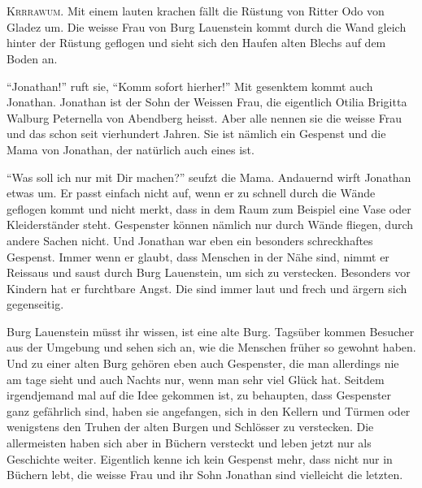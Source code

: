 \chapter*{}
\lettrine[lines=2]{\color{red}K}{rrrawum.} Mit einem lauten krachen fällt die Rüstung von Ritter Odo von Gladez um. Die weisse Frau von Burg Lauenstein kommt durch die Wand gleich hinter der Rüstung geflogen und sieht sich den Haufen alten Blechs auf dem Boden an.

\enquote{Jonathan!} ruft sie, \enquote{Komm sofort hierher!} Mit gesenktem kommt auch Jonathan. Jonathan ist der Sohn der Weissen Frau, die eigentlich Otilia Brigitta Walburg Peternella von Abendberg heisst. Aber alle nennen sie die weisse Frau und das schon seit vierhundert Jahren. Sie ist nämlich ein Gespenst und die Mama von Jonathan, der natürlich auch eines ist. 

\enquote{Was soll ich nur mit Dir machen?} seufzt die Mama. Andauernd wirft Jonathan etwas um. Er passt einfach nicht auf, wenn er zu schnell durch die Wände geflogen kommt und nicht merkt, dass in dem Raum zum Beispiel eine Vase oder Kleiderständer steht. Gespenster können nämlich nur durch Wände fliegen, durch andere Sachen nicht. Und Jonathan war eben ein besonders schreckhaftes Gespenst. Immer wenn er glaubt, dass Menschen in der Nähe sind, nimmt er Reissaus und saust durch Burg Lauenstein, um sich zu verstecken. Besonders vor Kindern hat er furchtbare Angst. Die sind immer laut und frech und ärgern sich gegenseitig. 

Burg Lauenstein müsst ihr wissen, ist eine alte Burg. Tagsüber kommen Besucher aus der Umgebung und sehen sich an, wie die Menschen früher so gewohnt haben. Und zu einer alten Burg gehören eben auch Gespenster, die man allerdings nie am tage sieht und auch Nachts nur, wenn man sehr viel Glück hat. Seitdem irgendjemand mal auf die Idee gekommen ist, zu behaupten, dass Gespenster ganz gefährlich sind, haben sie angefangen, sich in den Kellern und Türmen oder wenigstens den Truhen der alten Burgen und Schlösser zu verstecken. Die allermeisten haben sich aber in Büchern versteckt und leben jetzt nur als Geschichte weiter. Eigentlich kenne ich kein Gespenst mehr, dass nicht nur in Büchern lebt, die weisse Frau und ihr Sohn Jonathan sind vielleicht die letzten.


